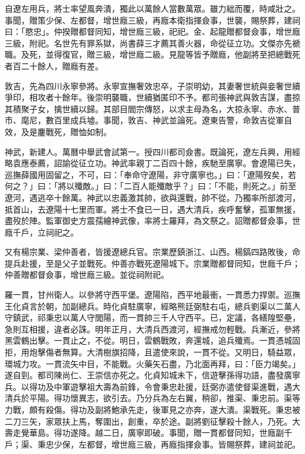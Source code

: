 \begin{pinyinscope}
自遼左用兵，將士率望風奔潰，獨此以萬餘人當數萬眾。雖力絀而覆，時咸壯之。事聞，贈策少保、左都督，增世廕三級，再廕本衛指揮僉事，世襲，賜祭葬，建祠曰：「愍忠」。仲揆贈都督同知，增世廕三級，祀祀。金、起龍贈都督僉事，增世廕三級，附祀。名世先有罪系獄，尚書薛三才薦其善火器，命從征立功。文傑亦先褫職。及死，並得復官，贈三級，增世廕二級。見龍等皆予贈廕，他副將至把總戰死者百二十餘人，贈廕有差。

敦吉，先為四川永寧參將。永寧宣撫奢效忠卒，子崇明幼，其妻奢世統與妾奢世續爭印，相攻者十餘年。後崇明襲職，世續猶匿印不予。都司張神武與敦吉謀，盡掠其積聚子女，擒世續以歸。其部目閻宗傳怒，以求主母為名，大掠永寧、赤水、普市、麾尼，數百里成兵墟。事聞，敦吉、神武並論死。遼東告警，命敦吉從軍自效，及是鏖戰死，贈恤如制。

神武，新建人。萬曆中舉武會試第一。授四川都司僉書。既論死，遼左兵興，用經略袁應泰薦，詔諭從征立功。神武率親丁二百四十餘，疾馳至廣寧。會遼陽已失，巡撫薛國用固留之，不可，曰：「奉命守遼陽，非守廣寧也。」曰：「遼陽歿矣，若何之？」曰：「將以殲敵。」曰：「二百人能殲敵乎？」曰：「不能，則死之。」前至遼河，遇逃卒十餘萬。神武以忠義激其帥，欲與還戰，帥不從。乃獨率所部渡河，抵首山，去遼陽十七里而軍。將士不食已一日，遇大清兵，疾呼奮擊，孤軍無援，盡歿於陣。監軍御史方震孺繪神武像，率將士羅拜，為文祭之。詔贈都督僉事，世廕千戶，立祠祀之。

又有楊宗業、梁仲善者，皆援遼總兵官。宗業歷鎮浙江、山西。楊鎬四路敗後，命提兵赴援，至是父子並戰死。仲善亦戰死遼陽城下。宗業贈都督同知，世廕千戶；仲善贈都督僉事，增世廕三級。並從祠附祀。

羅一貫，甘州衛人。以參將守西平堡。遼陽陷，西平地最衝，一貫悉力捍禦。巡撫王化貞言於朝，加副總兵。時化貞駐廣寧，經略熊廷弼駐右屯，總兵劉渠以二萬人守鎮武，祁秉忠以萬人守閭陽，而一貫帥三千人守西平。已，定議，各繕隍堅壘，急則互相援，違者必誅。明年正月，大清兵西渡河，經撫戒勿輕戰。兵漸近，參將黑雲鶴出擊。一貫止之，不從。明日，雲鶴戰敗，奔還城，追兵殲焉。一貫憑城固拒，用炮擊傷者無算。大清樹旗招降，且遣使來說，一貫不從。又明日，騎益眾，環城力攻。一貫流矢中目，不能戰。火藥矢石盡，乃北面再拜，曰：「臣力竭矣。」遂自剄。都司陳尚仁、王崇信亦死之。化貞知城未下，信遊擊孫得功語，盡發廣寧兵。以得功及中軍遊擊祖大壽為前鋒，令會秉忠赴援，廷弼亦遣使督渠進戰，遇大清兵於平陽。得功懷異志，欲引去。乃分兵為左右翼，稍卻，推渠、秉忠前。渠等力戰，頗有殺傷。得功及副將鮑承先走，後軍見之亦奔，遂大潰。渠戰死。秉忠被二刀三矢，家眾扶上馬，奪圍出，創重，卒於途。副將劉征擊殺十餘人，乃死。大壽走覺華島。得功遂降。越二日，廣寧即破。事聞，贈一貫都督同知，世廕副千戶；渠、秉忠少保，左都督，增世廕三級，再廕指揮僉事。皆賜祭葬，建祠並祀。


\end{pinyinscope}
